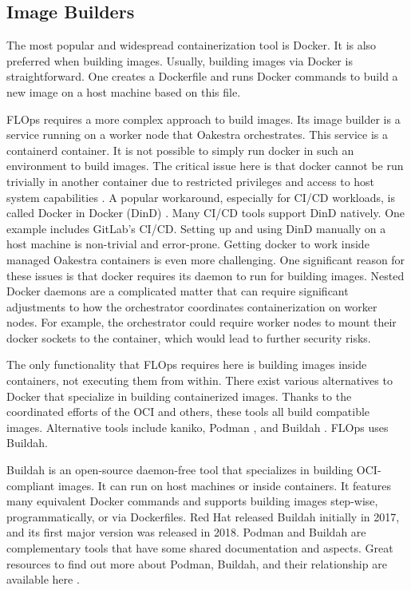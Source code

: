 \subsection{Image Builders} \label{subsection:image_builders}

The most popular and widespread containerization tool is Docker.
It is also preferred when building images.
Usually, building images via Docker is straightforward.
One creates a Dockerfile and runs Docker commands to build a new image on a host machine based on this file.

FLOps requires a more complex approach to build images.
Its image builder is a service running on a worker node that Oakestra orchestrates.
This service is a containerd container.
It is not possible to simply run docker in such an environment to build images.
The critical issue here is that docker cannot be run trivially in another container due to restricted privileges and access to host system capabilities \cite{paper:dind}.
A popular workaround, especially for CI/CD workloads, is called Docker in Docker (DinD) \cite{paper:dind}.
Many CI/CD tools support DinD natively.
One example includes GitLab's CI/CD.
Setting up and using DinD manually on a host machine is non-trivial and error-prone.
Getting docker to work inside managed Oakestra containers is even more challenging.
One significant reason for these issues is that docker requires its daemon to run for building images.
Nested Docker daemons are a complicated matter \cite{paper:dind} that can require significant adjustments to how the orchestrator coordinates containerization on worker nodes.
For example, the orchestrator could require worker nodes to mount their docker sockets to the container, which would lead to further security risks.

The only functionality that FLOps requires here is building images inside containers, not executing them from within.
There exist various alternatives to Docker that specialize in building containerized images.
Thanks to the coordinated efforts of the OCI \cite{open_container_initiative} and others, these tools all build compatible images.
Alternative tools include kaniko, Podman \cite{docs:podman}, and Buildah \cite{buildah_homepage}.
FLOps uses Buildah.

Buildah is an open-source daemon-free tool that specializes in building OCI-compliant images.
It can run on host machines or inside containers.
It features many equivalent Docker commands and supports building images step-wise, programmatically, or via Dockerfiles.
Red Hat released Buildah initially in 2017, and its first major version was released in 2018.
Podman and Buildah are complementary tools that have some shared documentation and aspects.
Great resources to find out more about Podman, Buildah, and their relationship are available here \cite{redhat_docs:podman,redhat_docs:buildah,buildah_vs_podman}.

